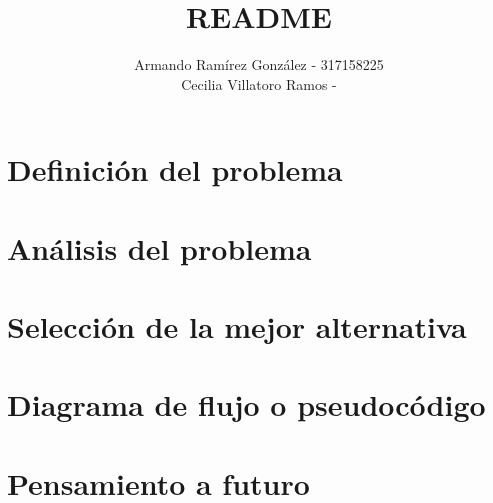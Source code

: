 \documentclass[]{article}
\title{README}
\author{Armando Ramírez González - 317158225 \\ Cecilia Villatoro Ramos - }
\begin{document}
\maketitle

\section{Definición del problema}
\section{Análisis del problema}
\section{Selección de la mejor alternativa}
\section{Diagrama de flujo o pseudocódigo}
\section{Pensamiento a futuro}
\end{document}
